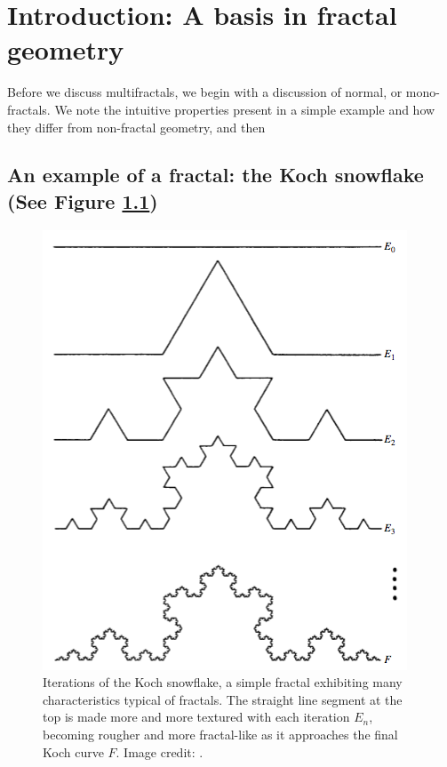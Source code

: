 
\chapter{Introduction: A basis in fractal geometry} %

\label{Chapter1} %



Before we discuss multifractals, we begin with a discussion of normal, or mono-fractals. We note the intuitive properties present in a simple example and how they differ from non-fractal geometry, and then 

\section{An example of a fractal: the Koch snowflake (See Figure \ref{fig:kochcurve})}\label{fractalexample}
\begin{figure}
\centering
\includegraphics[scale=0.5]{Chapters/Figures/Kochcurve.png} 
\caption[Koch Curve]{Iterations of the Koch snowflake, a simple fractal exhibiting many characteristics typical of fractals. The straight line segment at the top is made more and more textured with each iteration $E_{n}$, becoming rougher and more fractal-like as it approaches the final Koch curve $F$. Image credit: \citep{fractaltextbook}. }\label{fig:kochcurve}
\end{figure}

